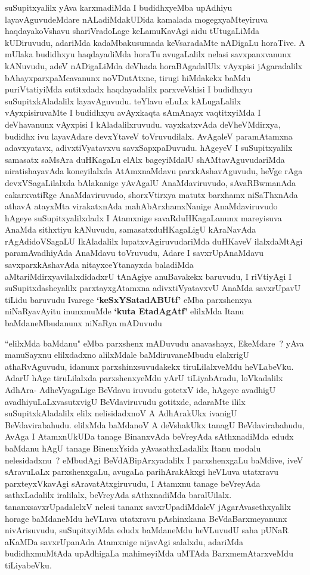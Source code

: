 \begin{artha}
suSupitxyalilx yAva karxmadiMda I budidhxyeMba upAdhiyu
layavAguvudeMdare nALadiMdakUDida kamalada mogegxyaMteyiruva
haqdayakoVshavu shariVradoLage keLamuKavAgi aidu tUtugaLiMda
kUDiruvudu, adariMda kadaMbakusumada keVsaradaMte nADigaLu horaTive. A
mUlaka budidhxyu haqdayadiMda horaTu avugaLalilx nelasi savxpanxvanunx
kANuvudu, adeV nADigaLiMda deVhada horaBAgadalUlx vAyxpisi
jAgaradalilx bAhayxparxpaMcavanunx noVDutAtxne, tirugi hiMdakekx baMdu
puriVtatiyiMda sutitxdadx haqdayadalilx parxveVshisi I budidhxyu
suSupitxkAladalilx layavAguvudu. teYlavu eLuLx kALugaLalilx
vAyxpisiruvaMte I budidhxyu avAyxkaqta sAmAnayx vaqtitxyiMda I
deVhavanunx vAyxpisi I kAladalilxruvudu. vayxkatxvAda deVheVMdirxya,
budidhx ivu layavAdare devxYtaveV toVruvudilalx. AvAgaleV paramAtamxna
adavxyatavx, adivxtiVyatavxvu savxSapxpaDuvudu. hAgeyeV I suSupitxyalilx
samasatx saMsAra duHKagaLu elAlx bageyiMdalU shAMtavAguvudariMda
niratishayavAda koneyilalxda AtAmxnaMdavu parxkAshavAguvudu, heVge rAga
devxVSagaLilalxda bAlakanige yAvAgalU AnaMdaviruvudo,
sAvaRBwmanAda cakarxvatiRge AnaMdaviruvudo, shorxVtirxya  matutx
barxhamx niSaThxnAda athavA atayxMta virakatxnAda 
mahAbArxhamxNanige AnaMdaviruvudo hAgeye suSupitxyalilxdadx I
Atamxnige savaRduHKagaLanunx mareyisuva AnaMda sithxtiyu kANuvudu,
samasatxduHKagaLigU kAraNavAda rAgAdidoVSagaLU IkAladalilx
lupatxvAgiruvudariMda duHKaveV ilalxdaMtAgi paramAvadhiyAda AnaMdavu
toVruvudu, Adare I savxrUpAnaMdavu savxparxkAshavAda nitayxceYtanayxda
baladiMda aMtariMdirxyavilalxdidadxrU tAnAgiye anuBavakekx baruvudu, I
riVtiyAgi I suSupitxdasheyalilx parxtayxgAtamxna adivxtiVyatavxvU AnaMda
savxrUpavU tiLidu baruvudu Ivarege \textbf{`keSxYSatadABUtf'} eMba parxshenxya
niNaRyavAyitu inunxmuMde \textbf{`kuta EtadAgAtf'} elilxMda Itanu
baMdaneMbudanunx niNaRya mADuvudu  \mdash 
\end{artha}


\begin{artha}
``elilxMda baMdanu" eMba parxshenx mADuvudu anavashayx, EkeMdare~? yAva manuSayxnu
elilxdadxno alilxMdale baMdiruvaneMbudu elalxrigU athaRvAguvudu,
idanunx parxshinxsuvudakekx tiruLilalxveMdu heVLabeVku. AdarU hAge
tiruLilalxda parxshenxyeMdu yArU tiLiyabAradu, loVkadalilx AdhAra-
AdheVyagaLige BeVdavu iruvudu gotetxV ide, hAgeye avadhigU
avadhiyuLaLxvasutxvigU BeVdaviruvudu gotitxde, adaraMte ililx suSupitxkAladalilx
elilx nelisidadxnoV A AdhArakUkx ivanigU BeVdavirabahudu. elilxMda
baMdanoV A deVshakUkx tanagU BeVdavirabahudu, AvAga  I AtamxnUkUDa
tanage BinanxvAda beVreyAda sAthxnadiMda edudx baMdanu hAgU tanage
BinenxYsida yAvasathxLadalilx Itanu modalu nelesidadxnu~? eMbudAgi BeVdABipArxyadalilx I parxshenxgaLu baMdive, iveV sAravuLaLx
parxshenxgaLu, avugaLa parihArakAkxgi heVLuva utatxravu
parxteyxVkavAgi sAravatAtxgiruvudu, I Atamxnu tanage beVreyAda
sathxLadalilx iralilalx, beVreyAda sAthxnadiMda baralUilalx.
tananxsavxrUpadalelxV nelesi tananx savxrUpadiMdaleV
jAgarAvasethxyalilx horage baMdaneMdu heVLuva utatxravu pAshinxkana
BeVdaBarxmeyanunx nivArisuvudu, suSupitxyiMda edudx baMdaneMdu
heVLuvudU saha pUNaR aKaMDa savxrUpanAda Atamxnige nijavAgi salalxdu,
adariMda budidhxmuMtAda upAdhigaLa mahimeyiMda uMTAda
BarxmemAtarxveMdu tiLiyabeVku.
\end{artha}

